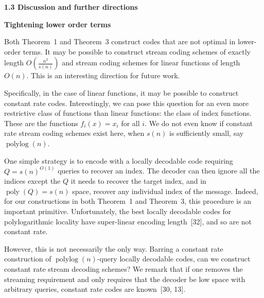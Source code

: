 \par\medskip\noindent\textbf{
1.3 Discussion and further directions}\par




\par\medskip\noindent\textbf{Tightening lower order terms}\par




Both Theorem 1 and Theorem 3 construct codes that are not optimal in lower-order terms. It may be possible to construct stream coding schemes of exactly length $O\left(\frac{n^{2}}{s(n)}\right)$ and stream coding schemes for linear functions of length $O(n)$. This is an interesting direction for future work.\par




Specifically, in the case of linear functions, it may be possible to construct constant rate codes. Interestingly, we can pose this question for an even more restrictive class of functions than linear functions: the class of index functions. These are the functions $f_{i}(x)=x_{i}$ for all $i$. We do not even know if constant rate stream coding schemes exist here, when $s(n)$ is sufficiently small, say $\operatorname{polylog}(n)$.\par




One simple strategy is to encode with a locally decodable code requiring $Q=s(n)^{O(1)}$ queries to recover an index. The decoder can then ignore all the indices except the $Q$ it needs to recover the target index, and in $\operatorname{poly}(Q)=s(n)$ space, recover any individual index of the message. Indeed, for our constructions in both Theorem 1 and Theorem 3, this procedure is an important primitive. Unfortunately, the best locally decodable codes for polylogarithmic locality have super-linear encoding length [32], and so are not constant rate.\par




However, this is not necessarily the only way. Barring a constant rate construction of $\operatorname{polylog}(n)$-query locally decodable codes, can we construct constant rate stream decoding schemes? We remark that if one removes the streaming requirement and only requires that the decoder be low space with arbitrary queries, constant rate codes are known [30, 13].\par





